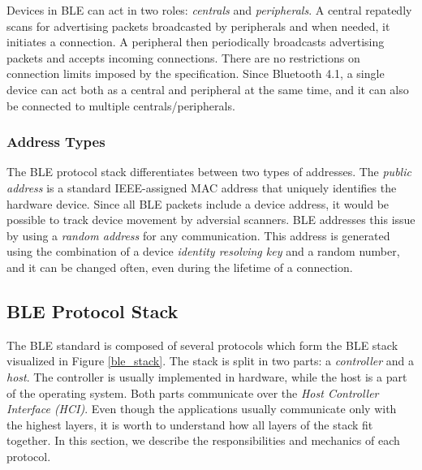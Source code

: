 Devices in BLE can act in two roles: \textit{centrals} and \textit{peripherals}. A central repatedly scans for advertising packets broadcasted by peripherals and when needed, it initiates a connection. A peripheral then periodically broadcasts advertising packets and accepts incoming connections. There are no restrictions on connection limits imposed by the specification. Since Bluetooth 4.1, a single device can act both as a central and peripheral at the same time, and it can also be connected to multiple centrals/peripherals.

\subsubsection{Address Types}

The BLE protocol stack differentiates between two types of addresses. The \textit{public address} is a standard IEEE-assigned MAC address that uniquely identifies the hardware device. Since all BLE packets include a device address, it would be possible to track device movement by adversial scanners. BLE addresses this issue by using a \textit{random address} for any communication. This address is generated using the combination of a device \textit{identity resolving key} and a random number, and it can be changed often, even during the lifetime of a connection.

\subsection{BLE Protocol Stack}

The BLE standard is composed of several protocols which form the BLE stack visualized in Figure \ref{ble_stack}. The stack is split in two parts: a \textit{controller} and a \textit{host}. The controller is usually implemented in hardware, while the host is a part of the operating system. Both parts communicate over the \textit{Host Controller Interface (HCI)}. Even though the applications usually communicate only with the highest layers, it is worth to understand how all layers of the stack fit together. In this section, we describe the responsibilities and mechanics of each protocol.

